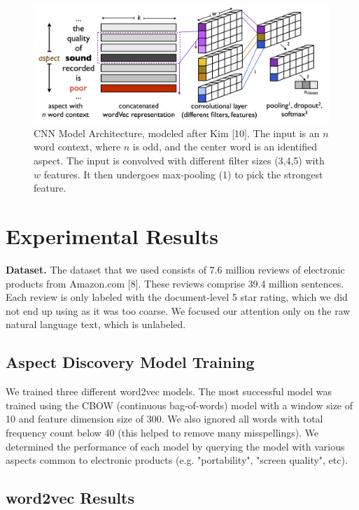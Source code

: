\documentclass{article} %
\begin{document}
\begin{figure}[ht]
\begin{center}
\includegraphics[width=\columnwidth]{model_architecture.png}
\end{center}
\caption{CNN Model Architecture, modeled after Kim [10]. The input is an $n$ word context, where $n$ is odd, and the center word is an identified aspect. The input is convolved with different filter sizes (3,4,5) with $w$ features. It then undergoes max-pooling (1) to pick the strongest feature.}
\label{architecture}
\end{figure}


\section{Experimental Results} 

\textbf{Dataset.} The dataset that we used consists of 7.6 million reviews of electronic products from Amazon.com [8]. These reviews comprise 39.4 million sentences. Each review is only labeled with the document-level 5 star rating, which we did not end up using as it was too coarse. We focused our attention only on the raw natural language text, which is unlabeled.


\subsection{Aspect Discovery Model Training} 

We trained three different word2vec models. The most successful model was trained using the CBOW (continuous bag-of-words) model with a window size of 10 and feature dimension size of 300. We also ignored all words with total frequency count below 40 (this helped to remove many misspellings). We determined the performance of each model by querying the model with various aspects common to electronic products (e.g. "portability", "screen quality", etc).

\subsection{word2vec Results}
\end{document}

